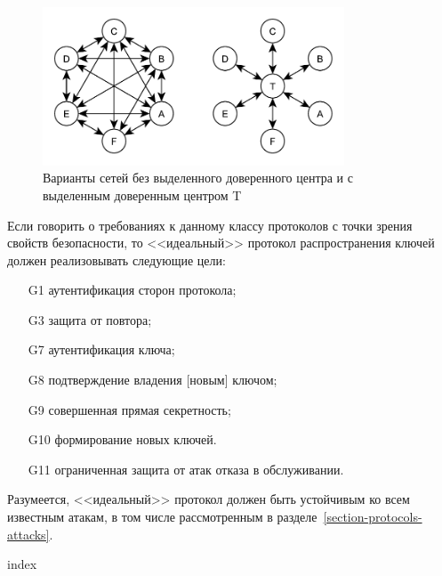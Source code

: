 \begin{figure}[!htb]
    \centering
    \includegraphics[width=0.8\textwidth]{pic/key_distribution-networks}
    \caption{Варианты сетей без выделенного доверенного центра и с выделенным доверенным центром T\label{fig:key_distribution-networks}}
\end{figure}

Если говорить о требованиях к данному классу протоколов с точки зрения свойств безопасности, то <<идеальный>> протокол распространения ключей должен реализовывать следующие цели:
\begin{itemize}
    \item[G1] аутентификация сторон протокола;
    \item[G3] защита от повтора;
    \item[G7] аутентификация ключа;
    \item[G8] подтверждение владения [новым] ключом;
    \item[G9] совершенная прямая секретность;
    \item[G10] формирование новых ключей.
    \item[G11] ограниченная защита от атак отказа в обслуживании.
\end{itemize}

Разумеется, <<идеальный>> протокол должен быть устойчивым ко всем известным атакам, в том числе рассмотренным в разделе~\ref{section-protocols-attacks}.

{index}










